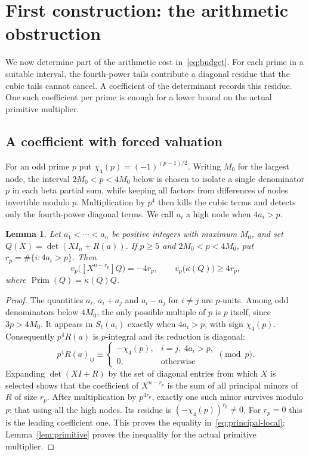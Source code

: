 \documentclass[11pt]{article}
\newtheorem{lemma}[theorem]{Lemma}
\theoremstyle{definition}
\theoremstyle{remark}
\numberwithin{equation}{section}
\newcommand{\vp}{v_p}
\newcommand{\coeff}[2]{[X^{#1}]#2}
\newcommand{\PP}{\operatorname{Prim}}
\begin{document}
\section{First construction: the arithmetic obstruction}\label{sec:principal}

We now determine part of the arithmetic cost in~\eqref{eq:budget}.
For each prime in a suitable interval, the fourth-power tails contribute
a diagonal residue that the cubic tails cannot cancel. A coefficient
of the determinant records this residue. One such coefficient per prime
is enough for a lower bound on the actual primitive multiplier.

\subsection{A coefficient with forced valuation}

For an odd prime $p$ put $\chi_4(p)=(-1)^{(p-1)/2}$.
Writing $M_0$ for the largest node, the interval $2M_0<p<4M_0$
below is chosen to isolate a single
denominator $p$ in each beta partial sum, while keeping all factors
from differences of nodes invertible modulo $p$. Multiplication by
$p^4$ then kills the cubic terms and detects only the fourth-power
diagonal terms. We call $a_i$ a high node when $4a_i>p$.

\begin{lemma}\label{lem:principal-local}
Let $a_1<\cdots<a_n$ be positive integers with maximum $M_0$, and set
$Q(X)=\det(XI_n+R(a))$. If $p\geq5$ and $2M_0<p<4M_0$, put
$r_p=\#\{i:4a_i>p\}$. Then
\begin{equation}\label{eq:principal-local}
 \vp\bigl(\coeff{n-r_p}{Q}\bigr)=-4r_p,
 \qquad \vp\bigl(\kappa(Q)\bigr)\geq4r_p,
\end{equation}
where $\PP(Q)=\kappa(Q)Q$.
\end{lemma}

\begin{proof}
The quantities $a_i$, $a_i+a_j$ and $a_i-a_j$ for $i\ne j$ are $p$-units.
Among odd denominators below $4M_0$, the only possible multiple of $p$
is $p$ itself, since $3p>4M_0$. It appears in $S_\ell(a_i)$ exactly when
$4a_i>p$, with sign $\chi_4(p)$. Consequently $p^4R(a)$ is $p$-integral
and its reduction is diagonal:
\begin{equation}\label{eq:principal-residue}
 p^4R(a)_{ij}\equiv
 \begin{cases}
 -\chi_4(p),&i=j,\ 4a_i>p,\\
 0,&\text{otherwise}
 \end{cases}\pmod p.
\end{equation}
Expanding $\det(XI+R)$ by the set of diagonal entries from which $X$
is selected shows that the coefficient of $X^{n-r_p}$ is the sum
of all principal minors of $R$ of size $r_p$.
After multiplication by $p^{4r_p}$, exactly one such
minor survives modulo $p$: that using all the high nodes. Its residue is
$(-\chi_4(p))^{r_p}\ne0$. For $r_p=0$ this is the leading coefficient
one. This proves the equality in~\eqref{eq:principal-local};
Lemma~\ref{lem:primitive} proves the inequality for the actual primitive
multiplier.
\end{proof}
\end{document}
